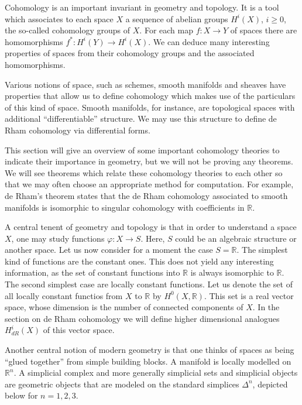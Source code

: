 Cohomology is an important invariant in geometry and topology. It is a tool which associates to each space $X$ a sequence of abelian groups $H^i(X)$, $i \ge 0$, the so-called cohomology groups of $X$. For each map $f: X \to Y$ of spaces there are homomorphisms $f^*: H^i(Y) \to H^i(X)$. We can deduce many interesting properties of spaces from their cohomology groups and the associated homomorphisms.

Various notions of space, such as schemes, smooth manifolds and sheaves have properties that allow us to define cohomology which makes use of the particulars of this kind of space. Smooth manifolds, for instance, are topological spaces with additional “differentiable” structure.  We may use this structure to define de Rham cohomology via differential forms.

This section will give an overview of some important cohomology theories to indicate their importance in geometry, but we will not be proving any theorems.
We will see theorems which relate these cohomology theories to each other so that we may often choose an appropriate method for computation. For example, de Rham's theorem states that the de Rham cohomology associated to smooth manifolds is isomorphic to singular cohomology with coefficients in $\mathbb{R}$. 

A central tenent of geometry and topology is that in order to understand a space $X$, one may study functions $\varphi: X \to S$. Here, $S$ could be an algebraic structure or another space. Let us now consider for a moment the case $S=\mathbb{R}$. The simplest kind of functions are the constant ones. This does not yield any interesting information, as the set of constant functions into $\mathbb{R}$ is always isomorphic to $\mathbb{R}$. The second simplest case are locally constant functions. Let us denote the set of all locally constant functios from $X$ to $\mathbb{R}$ by $H^0(X,\mathbb{R})$. This set is a real vector space, whose dimension is the number of connected components of $X$. In the section on de Rham cohomology we will define higher dimensional analogues $H^i_{dR}(X)$ of this vector space.

Another central notion of modern geometry is that one thinks of spaces as being “glued together” from simple building blocks. A manifold is locally modelled on $\mathbb{R}^n$. A simplicial complex and more generally simplicial sets and simplicial objects are geometric objects that are modeled on the standard simplices $\Delta^n$, depicted below for $n = 1,2,3$.

